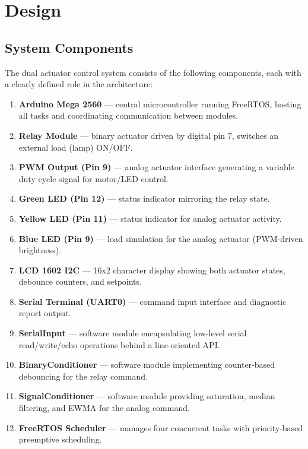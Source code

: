 \section{Design}

\subsection{System Components}

The dual actuator control system consists of the following components, each with a clearly defined role in the architecture:

\begin{enumerate}
    \item \textbf{Arduino Mega 2560} --- central microcontroller running FreeRTOS, hosting all tasks and coordinating communication between modules.
    \item \textbf{Relay Module} --- binary actuator driven by digital pin 7, switches an external load (lamp) ON/OFF.
    \item \textbf{PWM Output (Pin 9)} --- analog actuator interface generating a variable duty cycle signal for motor/LED control.
    \item \textbf{Green LED (Pin 12)} --- status indicator mirroring the relay state.
    \item \textbf{Yellow LED (Pin 11)} --- status indicator for analog actuator activity.
    \item \textbf{Blue LED (Pin 9)} --- load simulation for the analog actuator (PWM-driven brightness).
    \item \textbf{LCD 1602 I2C} --- 16x2 character display showing both actuator states, debounce counters, and setpoints.
    \item \textbf{Serial Terminal (UART0)} --- command input interface and diagnostic report output.
    \item \textbf{SerialInput} --- software module encapsulating low-level serial read/write/echo operations behind a line-oriented API.
    \item \textbf{BinaryConditioner} --- software module implementing counter-based debouncing for the relay command.
    \item \textbf{SignalConditioner} --- software module providing saturation, median filtering, and EWMA for the analog command.
    \item \textbf{FreeRTOS Scheduler} --- manages four concurrent tasks with priority-based preemptive scheduling.
\end{enumerate}

